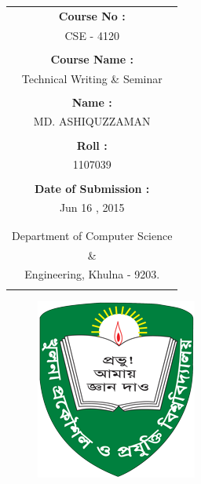 \documentclass[a4paper,12pt]{article}
\begin{document}
    \begin{center}
        \begin{tabular}{c}
            \\
            \textbf{Course No :}\\
            CSE - 4120\\
            \\
            \textbf{Course Name :}\\
            Technical Writing \& Seminar\\
            \\
            \textbf{Name :}\\
            MD. ASHIQUZZAMAN\\
            \\
            \textbf{Roll :}\\
            1107039\\
            \\
            \textbf{Date of Submission :}\\
            Jun  16 , 2015\\
            \\ \\
            Department of Computer Science\\
                    \&\\
            Engineering, Khulna - 9203.\\
            \\
        \end{tabular}

        \begin{figure}[htp]
        \begin{center}
        \includegraphics[scale=.42]{png/kuet.png}
        \end{center}
        \end{figure}

    \end{center}
\end{document}
